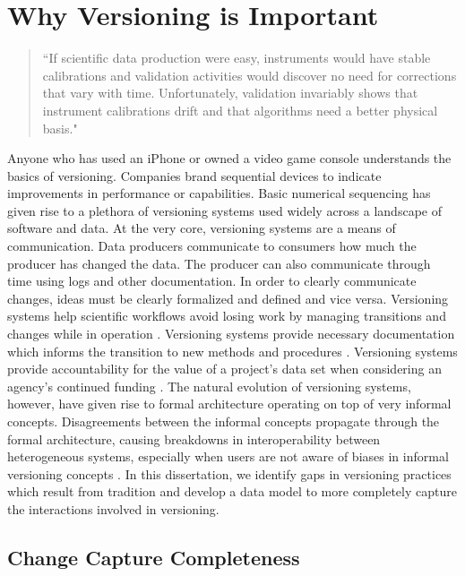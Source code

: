 \section{Why Versioning is Important}

\begin{quotation}
	``If scientific data production were easy, instruments would
	have stable calibrations and validation activities would discover no need for
	corrections that vary with time. Unfortunately, validation invariably shows that
	instrument calibrations drift and that algorithms need a better physical basis." \cite{Barkstrom2003}
\end{quotation}

Anyone who has used an iPhone or owned a video game console understands the basics of versioning.
Companies brand sequential devices to indicate improvements in performance or capabilities.
Basic numerical sequencing has given rise to a plethora of versioning systems used widely across a landscape of software and data.
At the very core, versioning systems are a means of communication.
Data producers communicate to consumers how much the producer has changed the data.
The producer can also communicate through time using logs and other documentation.
In order to clearly communicate changes, ideas must be clearly formalized and defined and vice versa.
Versioning systems help scientific workflows avoid losing work by managing transitions and changes while in operation \cite{Casati1996}.
Versioning systems provide necessary documentation which informs the transition to new methods and procedures \cite{Wiil:2000:RDH:338407.338517}.
Versioning systems provide accountability for the value of a project's data set when considering an agency's continued funding \cite{Cavanaugh2002}.
The natural evolution of versioning systems, however, have given rise to formal architecture operating on top of very informal concepts.
Disagreements between the informal concepts propagate through the formal architecture, causing breakdowns in interoperability between heterogeneous systems, especially when users are not aware of biases in informal versioning concepts \cite{Baker2009}.
In this dissertation, we identify gaps in versioning practices which result from tradition and develop a data model to more completely capture the interactions involved in versioning.

\subsection{Change Capture Completeness}

